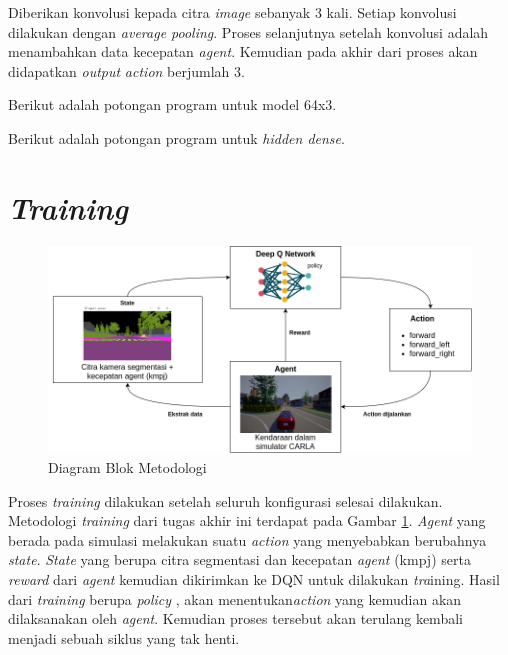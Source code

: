 Diberikan konvolusi kepada citra \textit{image} sebanyak 3 kali. Setiap konvolusi dilakukan dengan \textit{average pooling}. Proses selanjutnya setelah konvolusi adalah menambahkan data kecepatan \textit{agent}. Kemudian pada akhir dari proses akan didapatkan \textit{output} \textit{action} berjumlah 3.

Berikut adalah potongan program untuk model 64x3.


Berikut adalah potongan program untuk \textit{hidden dense}.



\section{\textit{Training}}
\label{sec:training}

\begin{figure}[H] 
	\centering
	\includegraphics[width=1\linewidth]{images/metodologi}
	\caption{Diagram Blok Metodologi}
	\label{fig:blockdiagram}
\end{figure}

Proses \textit{training} dilakukan setelah seluruh konfigurasi selesai dilakukan. Metodologi \textit{training} dari tugas akhir ini terdapat pada Gambar \ref{fig:blockdiagram}. \textit{Agent} yang berada pada simulasi melakukan suatu \textit{action} yang menyebabkan berubahnya \textit{state}. \textit{State} yang berupa citra segmentasi dan kecepatan \textit{agent} (kmpj) serta \textit{reward }dari \textit{agent} kemudian dikirimkan ke DQN untuk dilakukan \textit{tra}ining. Hasil dari \textit{training} berupa \textit{policy },  akan menentukan\textit{action} yang kemudian akan dilaksanakan oleh \textit{agent}. Kemudian proses tersebut akan terulang kembali menjadi sebuah siklus yang tak henti.

